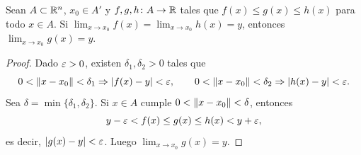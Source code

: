\begin{theorem}
  Sean \(A \subset \mathbb{R}^n\), \(x_0 \in A'\) y \(f, g, h\colon A \to \mathbb{R}\) tales que \(f(x) \leq g(x) \leq h(x)\) para todo \(x \in A\). Si \(\lim_{x \to x_0} f(x) = \lim_{x \to x_0} h(x) = y\), entonces \(\lim_{x \to x_0} g(x) = y\).
\end{theorem}

\begin{proof}
  Dado \(\varepsilon > 0\), existen \(\delta_1, \delta_2 > 0\) tales que
  \[
    0 < \left\lVert x - x_0 \right\rVert < \delta_1 \Rightarrow |f(x) - y| < \varepsilon, \qquad 0 < \left\lVert x - x_0 \right\rVert < \delta_2 \Rightarrow |h(x) - y| < \varepsilon.
  \]
  Sea \(\delta = \min\{\delta_1, \delta_2\}\). Si \(x \in A\) cumple \(0 < \left\lVert x - x_0 \right\rVert < \delta\), entonces
  \[
    y - \varepsilon < f(x) \leq g(x) \leq h(x) < y + \varepsilon,
  \]
  es decir, \(|g(x) - y| < \varepsilon\). Luego \(\lim_{x \to x_0} g(x) = y\).
\end{proof}
